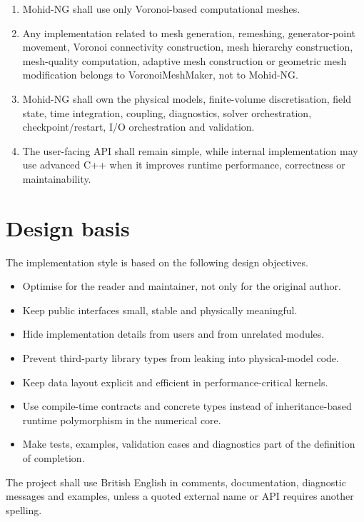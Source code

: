 \documentclass[11pt,a4paper]{article}
\begin{document}
\begin{enumerate}
  \item Mohid-NG shall use only Voronoi-based computational meshes.
  \item Any implementation related to mesh generation, remeshing, generator-point movement, Voronoi connectivity construction, mesh hierarchy construction, mesh-quality computation, adaptive mesh construction or geometric mesh modification belongs to VoronoiMeshMaker, not to Mohid-NG.
  \item Mohid-NG shall own the physical models, finite-volume discretisation, field state, time integration, coupling, diagnostics, solver orchestration, checkpoint/restart, I/O orchestration and validation.
  \item The user-facing API shall remain simple, while internal implementation may use advanced C++ when it improves runtime performance, correctness or maintainability.
\end{enumerate}

\section{Design basis}

The implementation style is based on the following design objectives.

\begin{itemize}
  \item Optimise for the reader and maintainer, not only for the original author.
  \item Keep public interfaces small, stable and physically meaningful.
  \item Hide implementation details from users and from unrelated modules.
  \item Prevent third-party library types from leaking into physical-model code.
  \item Keep data layout explicit and efficient in performance-critical kernels.
  \item Use compile-time contracts and concrete types instead of inheritance-based runtime polymorphism in the numerical core.
  \item Make tests, examples, validation cases and diagnostics part of the definition of completion.
\end{itemize}

The project shall use British English in comments, documentation, diagnostic messages and examples, unless a quoted external name or API requires another spelling.
\end{document}
